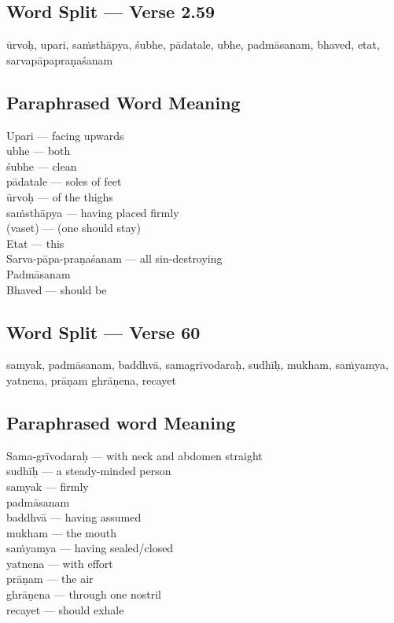 \subsection*{Word Split --- Verse 2.59}


ūrvoḥ, upari, saṁsthāpya, śubhe, pādatale, ubhe, padmāsanam, bhaved, etat, sarvapāpapraṇaśanam

\subsection*{Paraphrased Word Meaning}


\begin{multicols}{2}
Upari --- facing upwards \\
ubhe --- both \\
śubhe --- clean\\ 
pādatale --- soles of feet \\
ūrvoḥ ---  of the thighs \\
saṁsthāpya --- having placed firmly \\
(vaset) --- (one should stay)\\
Etat --- this \\
Sarva-pāpa-praṇaśanam --- all sin-destroying \\
Padmāsanam \\
Bhaved --- should be
\end{multicols}

\subsection*{Word Split --- Verse 60}


samyak, padmāsanam, baddhvā, samagrīvodaraḥ, sudhīḥ, mukham, saṁyamya, yatnena, prāṇam ghrāṇena, recayet

\subsection*{Paraphrased word Meaning}


\begin{multicols}{2}
Sama-grīvodaraḥ --- with neck and abdomen straight \\
sudhīḥ  --- a steady-minded person \\
samyak --- firmly \\
padmāsanam \\
baddhvā --- having assumed \\
mukham --- the mouth \\
saṁyamya --- having sealed/closed \\
yatnena --- with effort \\
prāṇam --- the air \\
ghrāṇena --- through one nostril \\
recayet --- should exhale 
\end{multicols}

